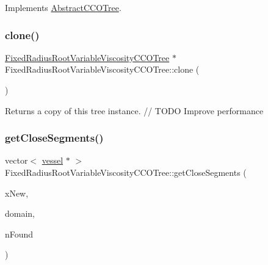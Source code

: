 Implements \mbox{\hyperlink{class_abstract_c_c_o_tree}{Abstract\+C\+C\+O\+Tree}}.

\mbox{\label{class_fixed_radius_root_variable_viscosity_c_c_o_tree_a0389e2b36c990dfa2cce140bc186b1f5}} 
\subsubsection{\texorpdfstring{clone()}{clone()}}
{\footnotesize\ttfamily \mbox{\hyperlink{class_fixed_radius_root_variable_viscosity_c_c_o_tree}{Fixed\+Radius\+Root\+Variable\+Viscosity\+C\+C\+O\+Tree}} $\ast$ Fixed\+Radius\+Root\+Variable\+Viscosity\+C\+C\+O\+Tree\+::clone (\begin{DoxyParamCaption}{ }\end{DoxyParamCaption})}

Returns a copy of this tree instance. // T\+O\+DO Improve performance \mbox{\label{class_fixed_radius_root_variable_viscosity_c_c_o_tree_ae7a54cd9971cea1ed9b94e2c5f874e78}} 
\subsubsection{\texorpdfstring{get\+Close\+Segments()}{getCloseSegments()}}
{\footnotesize\ttfamily vector$<$ \mbox{\hyperlink{structvessel}{vessel}} $\ast$ $>$ Fixed\+Radius\+Root\+Variable\+Viscosity\+C\+C\+O\+Tree\+::get\+Close\+Segments (\begin{DoxyParamCaption}\item[{\mbox{\hyperlink{structpoint}{point}}}]{x\+New,  }\item[{\mbox{\hyperlink{class_abstract_domain}{Abstract\+Domain}} $\ast$}]{domain,  }\item[{int $\ast$}]{n\+Found }\end{DoxyParamCaption})\hspace{0.3cm}{\ttfamily [virtual]}}

